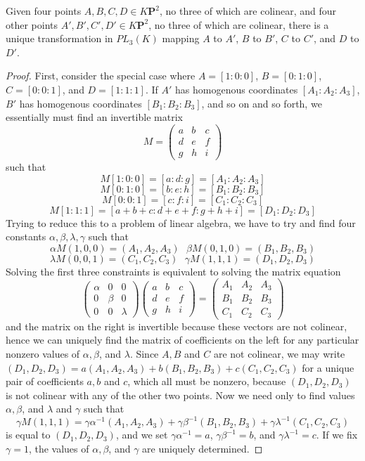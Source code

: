 \begin{theorem}
    Given four points $A,B,C,D \in K\mathbf{P}^2$, no three of which are colinear, and four other points $A',B',C',D' \in K\mathbf{P}^2$, no three of which are colinear, there is a unique transformation in $PL_3(K)$ mapping $A$ to $A'$, $B$ to $B'$, $C$ to $C'$, and $D$ to $D'$.
\end{theorem}
\begin{proof}
    First, consider the special case where $A = [1:0:0]$, $B = [0:1:0]$, $C = [0:0:1]$, and $D = [1:1:1]$. If $A'$ has homogenous coordinates $[A_1:A_2:A_3]$, $B'$ has homogenous coordinates $[B_1:B_2:B_3]$, and so on and so forth, we essentially must find an invertible matrix
    \[ M = \begin{pmatrix} a & b & c \\ d & e & f \\ g & h & i \end{pmatrix} \]
    such that
    \[ M[1:0:0] = [a:d:g] = [A_1:A_2:A_3] \]
    \[ M[0:1:0] = [b:e:h] = [B_1:B_2:B_3] \]
    \[ M[0:0:1] = [c:f:i] = [C_1:C_2:C_3] \]
    \[ M[1:1:1] = [a+b+c:d+e+f:g+h+i] = [D_1:D_2:D_3] \]
    Trying to reduce this to a problem of linear algebra, we have to try and find four constants $\alpha, \beta, \lambda, \gamma$ such that
    \[ \alpha M(1,0,0) = (A_1,A_2,A_3)\ \ \ \beta M(0,1,0) = (B_1,B_2,B_3) \]
    \[ \lambda M(0,0,1) = (C_1,C_2,C_3)\ \ \ \gamma M(1,1,1) = (D_1,D_2,D_3) \]
    Solving the first three constraints is equivalent to solving the matrix equation
    \[ \begin{pmatrix} \alpha & 0 & 0 \\ 0 & \beta & 0 \\ 0 & 0 & \lambda \end{pmatrix} \begin{pmatrix} a & b & c \\ d & e & f \\ g & h & i \end{pmatrix} = \begin{pmatrix} A_1 & A_2 & A_3 \\ B_1 & B_2 & B_3 \\ C_1 & C_2 & C_3 \end{pmatrix} \]
    and the matrix on the right is invertible because these vectors are not colinear, hence we can uniquely find the matrix of coefficients on the left for any particular nonzero values of $\alpha, \beta$, and $\lambda$. Since $A,B$ and $C$ are not colinear, we may write $(D_1,D_2,D_3) = a(A_1,A_2,A_3) + b(B_1,B_2,B_3) + c(C_1,C_2,C_3)$ for a unique pair of coefficients $a,b$ and $c$, which all must be nonzero, because $(D_1,D_2,D_3)$ is not colinear with any of the other two points. Now we need only to find values $\alpha, \beta$, and $\lambda$ and $\gamma$ such that
    \[ \gamma M(1,1,1) = \gamma \alpha^{-1}(A_1,A_2,A_3) + \gamma \beta^{-1}(B_1,B_2,B_3) + \gamma \lambda^{-1}(C_1,C_2,C_3) \]
    is equal to $(D_1,D_2,D_3)$, and we set $\gamma \alpha^{-1} = a$, $\gamma \beta^{-1} = b$, and $\gamma \lambda^{-1} = c$. If we fix $\gamma = 1$, the values of $\alpha, \beta$, and $\gamma$ are uniquely determined.
\end{proof}

